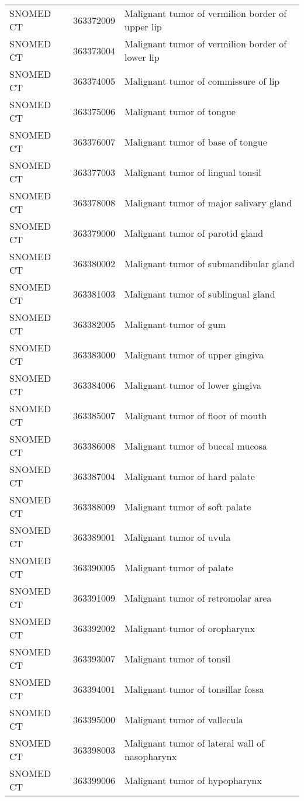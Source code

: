 \begin{longtable}{p{}p{}p{}}
  SNOMED CT & 363372009 & Malignant tumor of vermilion border of upper lip \\ 
  SNOMED CT & 363373004 & Malignant tumor of vermilion border of lower lip \\ 
  SNOMED CT & 363374005 & Malignant tumor of commissure of lip \\ 
  SNOMED CT & 363375006 & Malignant tumor of tongue \\ 
  SNOMED CT & 363376007 & Malignant tumor of base of tongue \\ 
  SNOMED CT & 363377003 & Malignant tumor of lingual tonsil \\ 
  SNOMED CT & 363378008 & Malignant tumor of major salivary gland \\ 
  SNOMED CT & 363379000 & Malignant tumor of parotid gland \\ 
  SNOMED CT & 363380002 & Malignant tumor of submandibular gland \\ 
  SNOMED CT & 363381003 & Malignant tumor of sublingual gland \\ 
  SNOMED CT & 363382005 & Malignant tumor of gum \\ 
  SNOMED CT & 363383000 & Malignant tumor of upper gingiva \\ 
  SNOMED CT & 363384006 & Malignant tumor of lower gingiva \\ 
  SNOMED CT & 363385007 & Malignant tumor of floor of mouth \\ 
  SNOMED CT & 363386008 & Malignant tumor of buccal mucosa \\ 
  SNOMED CT & 363387004 & Malignant tumor of hard palate \\ 
  SNOMED CT & 363388009 & Malignant tumor of soft palate \\ 
  SNOMED CT & 363389001 & Malignant tumor of uvula \\ 
  SNOMED CT & 363390005 & Malignant tumor of palate \\ 
  SNOMED CT & 363391009 & Malignant tumor of retromolar area \\ 
  SNOMED CT & 363392002 & Malignant tumor of oropharynx \\ 
  SNOMED CT & 363393007 & Malignant tumor of tonsil \\ 
  SNOMED CT & 363394001 & Malignant tumor of tonsillar fossa \\ 
  SNOMED CT & 363395000 & Malignant tumor of vallecula \\ 
  SNOMED CT & 363398003 & Malignant tumor of lateral wall of nasopharynx \\ 
  SNOMED CT & 363399006 & Malignant tumor of hypopharynx \\ 

\end{longtable}
